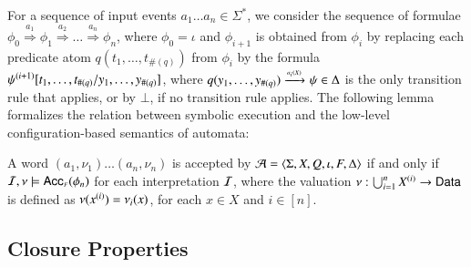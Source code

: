 \documentclass{llncs}
\begin{document}
For a sequence of input events $a_1 \ldots a_n \in \Sigma^*$, we
consider the sequence of formulae \(\phi_0 \stackrel{a_1}{\Rightarrow}
\phi_1 \stackrel{a_2}{\Rightarrow} \ldots \stackrel{a_n}{\Rightarrow}
\phi_n\), where $\phi_0 = \iota$ and $\phi_{i+1}$ is obtained from
$\phi_i$ by replacing each predicate atom $q(t_1,\ldots,t_{\#(q)})$
from $\phi_i$ by the formula ${\psi}^{({i+1})}[t_1, \ldots,
  t_{\#(q)}/y_1,\ldots,y_{\#(q)}]$, where $q(y_1,\ldots,y_{\#(q)})
\xrightarrow{{\scriptscriptstyle a_i(X)}}_{{\scriptstyle }} \psi \in \Delta$ is the only transition rule that
applies, or by $\bot$, if no transition rule applies. The following
lemma formalizes the relation between symbolic execution and the
low-level configuration-based semantics of automata:

\begin{lemma}\label{lemma:symbolic-execution}
  A word $(a_1,\nu_1) \ldots (a_n,\nu_n)$ is accepted by $\mathcal{A} =
  \langle \Sigma,X,Q,\iota,F,\Delta \rangle$ if and only if $\mathcal{I},\nu \models
  \mathsf{Acc}_{\scriptscriptstyle{F}}({\phi_n})$ for each interpretation $\mathcal{I}$, where the
  valuation $\nu : \bigcup_{i=1}^n {X}^{({i})} \rightarrow \mathsf{Data}$ is
  defined as $\nu({x}^{({i})}) = \nu_i(x)$, for each $x \in X$ and $i
  \in [n]$.
\end{lemma}

\subsection{Closure Properties}
\end{document}
